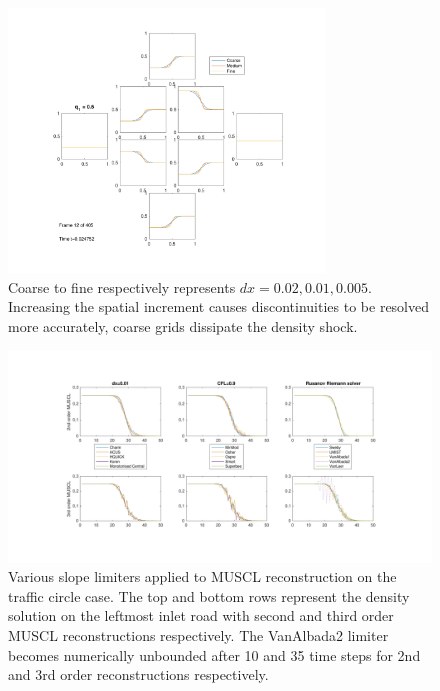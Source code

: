 	\begin{figure}
    		\centering
        		\includegraphics[trim=80 50 80 50,clip,width=0.75\textwidth]{trafficCircles3.pdf}
		\caption[Traffic Circles : Spatial refinement]{Coarse to fine respectively represents $dx=0.02,0.01,0.005$. Increasing the spatial increment causes discontinuities to be resolved more accurately, coarse grids dissipate the density shock.}
		\label{fig:randd:traffic_circles_dx}
	\end{figure}
	\begin{figure}
    		\centering
        		\includegraphics[trim=140 85 135 70,clip,width=\textwidth]{trafficcircles_Limiters.pdf}
		\caption[Traffic Circles : MUSCL limiters]{Various slope limiters applied to MUSCL reconstruction on the traffic circle case. The top and bottom rows represent the density solution on the leftmost inlet road with second and third order MUSCL reconstructions respectively. The VanAlbada2 limiter becomes numerically unbounded after 10 and 35 time steps for 2nd and 3rd order reconstructions respectively.}
		\label{fig:randd:traffic_circles:limiters}
	\end{figure}

